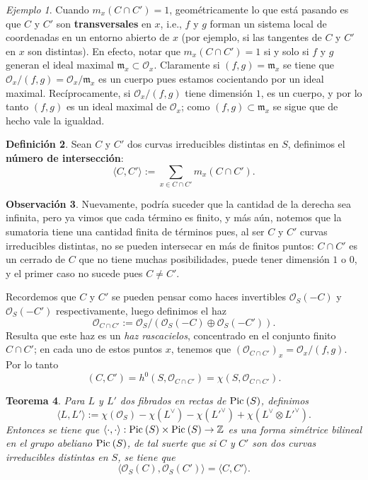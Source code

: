 \documentclass[spanish,12pt]{amsart}
\newcommand{\Pic}[1]{\textup{Pic}{ \: (#1)}}
\newtheorem{theorem}{Teorema}[section]
\theoremstyle{definition}
\newtheorem{definition}[theorem]{Definición}
\newtheorem{obs}[theorem]{Observación}
\theoremstyle{remark}
\newtheorem{example}[theorem]{Ejemplo}
\numberwithin{equation}{section}
\newcommand{\integers}{\mathbb{Z}}
\renewcommand{\O}{\mathcal{O}}
\begin{document}
\begin{example}
Cuando $m_x ( C \cap C') = 1$, geométricamente lo que está pasando es que $C$ y $C'$ son \textbf{transversales} en $x$, i.e., $f$ y $g$ forman un sistema local de coordenadas en un entorno abierto de $x$ (por ejemplo, si las tangentes de $C$ y $C'$ en $x$ son distintas). En efecto, notar que $m_x (C \cap C') = 1$ si y solo si $f$ y $g$ generan el ideal maximal $\mathfrak m_x \subset \O_x$. Claramente si $(f,g) = \mathfrak m_x$ se tiene que $\O_x / (f,g) = \O_x / \mathfrak m_x$ es un cuerpo pues estamos cocientando por un ideal maximal. Recíprocamente, si $\O_x /(f,g)$ tiene dimensión $1$, es un cuerpo, y por lo tanto $(f,g)$ es un ideal maximal de $\O_x$; como $(f,g) \subset \mathfrak m_x$ se sigue que de hecho vale la igualdad.
\end{example}




\begin{definition}
Sean $C$ y $C'$ dos curvas irreducibles distintas en $S$, definimos el \textbf{número de intersección}:
\[
    \langle C, C' \rangle := \sum_{x \in C \cap C'} m_x (C \cap C').
\]
\end{definition}

\begin{obs}
Nuevamente, podría suceder que la cantidad de la derecha sea infinita, pero ya vimos que cada término es finito, y más aún, notemos que la sumatoria tiene una cantidad finita de términos pues, al ser $C$ y $C'$ curvas irreducibles distintas, no se pueden intersecar en más de finitos puntos: $C\cap C'$ es un cerrado de $C$ que no tiene muchas posibilidades, puede tener dimensión $1$ o $0$, y el primer caso no sucede pues $C \neq C'$.
\end{obs}

Recordemos que $C$ y $C'$ se pueden pensar como haces invertibles $\O_S (-C)$ y $\O_S (-C')$ respectivamente, luego definimos el haz
\[
    \O_{C \cap C'} := \O_S / \left ( \O_S (-C) \oplus \O_S (-C') \right).
\]
Resulta que este haz es un \textit{haz rascacielos}, concentrado en el conjunto finito $C \cap C'$; en cada uno de estos puntos $x$, tenemos que $(\O_{C \cap C'})_x = \O_x / (f,g)$. Por lo tanto
\[
    (C,C') = h^0 (S, \O_{C\cap C'})  = \chi (S, \O_{C \cap C'}).
\]

\begin{theorem}\label{th:teorema 1}
Para $L$ y $L'$ dos fibrados en rectas de $\Pic S$, definimos
\[
   \langle L , L' \rangle  := \chi (\O_S) - \chi (L^\vee) - \chi (L'^{\vee}) + \chi (L^\vee \otimes L'^{\vee}).
\]
Entonces se tiene que $\langle \cdot, \cdot \rangle : \Pic S \times \Pic S \to \integers$ es una forma simétrice bilineal en el grupo abeliano $\Pic S$, de tal suerte que si $C$ y $C'$ son dos curvas irreducibles distintas en $S$, se tiene que
\[
    \langle \O_S (C), \O_ S (C')\rangle = \langle C,C'\rangle.
\]
\end{theorem}
\end{document}
